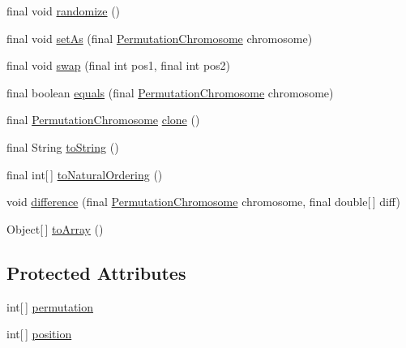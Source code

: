 \begin{DoxyCompactItemize}
\item 
final void \hyperlink{classjenes_1_1chromosome_1_1_permutation_chromosome_af1bec1fbdb637818dd33fbbe3c43d07f}{randomize} ()
\item 
final void \hyperlink{classjenes_1_1chromosome_1_1_permutation_chromosome_ad1e5735c594b7c43f7cca5996da5741e}{set\-As} (final \hyperlink{classjenes_1_1chromosome_1_1_permutation_chromosome}{Permutation\-Chromosome} chromosome)
\item 
final void \hyperlink{classjenes_1_1chromosome_1_1_permutation_chromosome_a9dbfb8b76280184a204e89f737740f8f}{swap} (final int pos1, final int pos2)
\item 
final boolean \hyperlink{classjenes_1_1chromosome_1_1_permutation_chromosome_a2cac25997ad82e5f3793bd65c8de1b37}{equals} (final \hyperlink{classjenes_1_1chromosome_1_1_permutation_chromosome}{Permutation\-Chromosome} chromosome)
\item 
final \hyperlink{classjenes_1_1chromosome_1_1_permutation_chromosome}{Permutation\-Chromosome} \hyperlink{classjenes_1_1chromosome_1_1_permutation_chromosome_a026be97457b0600bf9c4467e34073e93}{clone} ()
\item 
final String \hyperlink{classjenes_1_1chromosome_1_1_permutation_chromosome_a63f526a0f6f85fda55f2bcacbacd2072}{to\-String} ()
\item 
final int\mbox{[}$\,$\mbox{]} \hyperlink{classjenes_1_1chromosome_1_1_permutation_chromosome_a0aeb1df52bf751baa4706e5d94dae60d}{to\-Natural\-Ordering} ()
\item 
void \hyperlink{classjenes_1_1chromosome_1_1_permutation_chromosome_a20c34256408cab0b265d69decd40dabd}{difference} (final \hyperlink{classjenes_1_1chromosome_1_1_permutation_chromosome}{Permutation\-Chromosome} chromosome, final double\mbox{[}$\,$\mbox{]} diff)
\item 
Object\mbox{[}$\,$\mbox{]} \hyperlink{classjenes_1_1chromosome_1_1_permutation_chromosome_a8b14d4ba9c616335a901103f1879569a}{to\-Array} ()
\end{DoxyCompactItemize}
\subsection*{Protected Attributes}
\begin{DoxyCompactItemize}
\item 
int\mbox{[}$\,$\mbox{]} \hyperlink{classjenes_1_1chromosome_1_1_permutation_chromosome_a8b5701fbbb3cdfef29d346e0375260fc}{permutation}
\item 
int\mbox{[}$\,$\mbox{]} \hyperlink{classjenes_1_1chromosome_1_1_permutation_chromosome_aeb2d393eb8a9cc106205e13fb88446cc}{position}
\end{DoxyCompactItemize}
